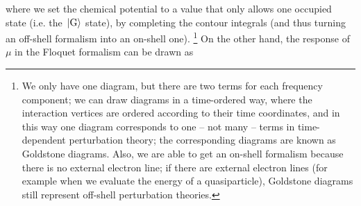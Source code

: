 \documentclass[hyperref, a4paper]{article}
\begin{document}
where we set the chemical potential to a value that only allows one occupied state 
(i.e. the $\ket*{\text{G}}$ state),
by completing the contour integrals (and thus turning an off-shell formalism into an on-shell one).%
\footnote{
    We only have one diagram, but there are two terms for each frequency component; 
    we can draw diagrams in a time-ordered way, 
    where the interaction vertices are ordered according to their time coordinates,
    and in this way one diagram corresponds to one -- not many -- 
    terms in time-dependent perturbation theory; 
    the corresponding diagrams are known as Goldstone diagrams.
    Also, we are able to get an on-shell formalism 
    because there is no external electron line; 
    if there are external electron lines
    (for example when we evaluate the energy of a quasiparticle), 
    Goldstone diagrams still represent off-shell perturbation theories.
}
On the other hand, the response of $\mu$ in the Floquet formalism can be drawn as 
\end{document}
